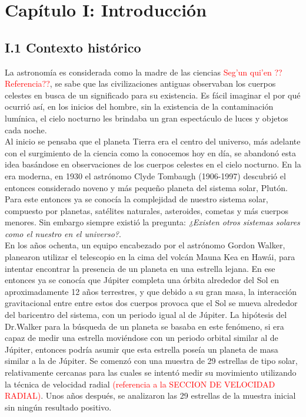 \chapter*{\textbf{Capítulo I: Introducción}}
\setcounter{chapter}{1}


\section*{I.1 Contexto histórico}

La astronomía es considerada como la madre de las ciencias \textcolor{red}{Seg'un qui'en ??  Referencia??}, se sabe que las civilizaciones antiguas observaban los cuerpos celestes en busca de un significado para su existencia. Es fácil imaginar el por qué ocurrió así, en los inicios del hombre, sin la existencia de la contaminación lumínica, el cielo nocturno les brindaba un gran espectáculo de luces y objetos cada noche.\\

Al inicio se pensaba que el planeta Tierra era el centro del universo, más adelante con el surgimiento de la ciencia como la conocemos hoy en día, se abandonó esta idea basándose en observaciones de los cuerpos celestes en el cielo nocturno. En la era moderna, en 1930 el astrónomo Clyde Tombaugh (1906-1997) descubrió el entonces considerado noveno y más pequeño planeta del sistema solar, Plutón. Para este entonces ya se conocía la complejidad de nuestro sistema solar, compuesto por planetas, satélites naturales, asteroides, cometas y más cuerpos menores. Sin embargo siempre existió la pregunta: \textit{¿Existen otros sistemas solares como el nuestro en el universo?}.\\

En los años ochenta, un equipo encabezado por el astrónomo Gordon Walker, planearon utilizar el telescopio en la cima del volcán Mauna Kea en Hawái, para intentar encontrar la presencia de un planeta en una estrella lejana. En ese entonces ya se conocía que Júpiter completa una órbita alrededor del Sol en aproximadamente 12 años terrestres, y que debido a su gran masa, la interacción gravitacional entre entre estos dos cuerpos provoca que el Sol se mueva alrededor del baricentro del sistema, con un periodo igual al de Júpiter. La hipótesis del Dr.Walker para la búsqueda de un planeta se basaba en este fenómeno, si era capaz de medir una estrella moviéndose con un periodo orbital similar al de Júpiter, entonces podría asumir que esta estrella poseía un planeta de masa similar a la de Júpiter. Se comenzó con una muestra de 29 estrellas de tipo solar, relativamente cercanas para las cuales se intentó medir su movimiento utilizando la técnica de velocidad radial \textcolor{red}{(referencia a la SECCION DE VELOCIDAD RADIAL)}. Unos años después, se analizaron las 29 estrellas de la muestra inicial sin ningún resultado positivo.\\ 

